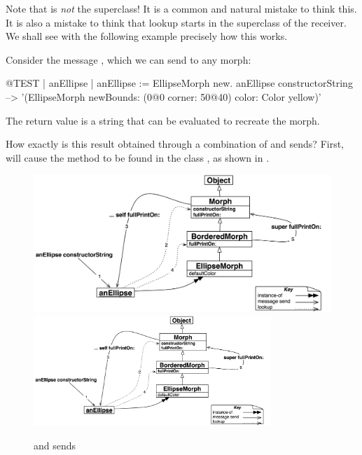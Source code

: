 \documentclass[a4paper,10pt,twoside]{book}
\begin{document}
Note that \super is \emph{not} the superclass!
It is a common and natural mistake to think this.
It is also a mistake to think that lookup starts in the superclass of the receiver.
We shall see with the following example precisely how this works.

Consider the message , which we can send to any morph:
\begin{code}{@TEST | anEllipse | anEllipse := EllipseMorph new.}
anEllipse constructorString --> '(EllipseMorph newBounds: (0@0 corner: 50@40) color: Color yellow)'
\end{code}
The return value is a string that can be evaluated to recreate the morph.

How exactly is this result obtained through a combination of \self and \super sends?
First,  will cause the method  to be found in the class ,
as shown in .

\begin{figure}[htb]
\begin{center}
\ifluluelse
	{\includegraphics[width=\textwidth]{constructorStringLookup}}
	{\includegraphics[width=0.8\textwidth]{constructorStringLookup}}
\caption{\self and \super sends}
\end{center}
\end{figure}
\end{document}
